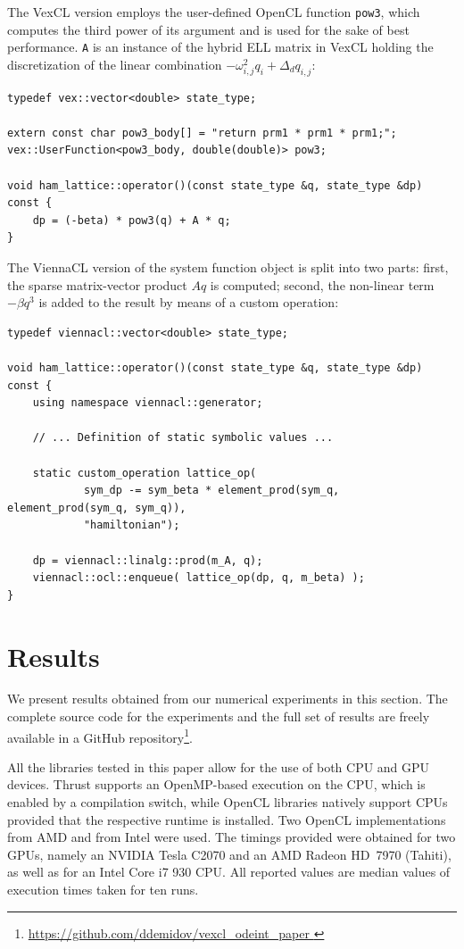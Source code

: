 \documentclass[final]{siamltex}
\newcommand{\code}[1]{\lstinline|#1|}
\begin{document}
The VexCL version employs the user-defined OpenCL function \code{pow3}, which
computes the third power of its argument and is used for the sake of best performance.
\code{A} is an instance of the hybrid ELL matrix in VexCL
holding the discretization of the linear combination $- \omega_{i,j}^2 q_i + \Delta_d q_{i,j}$:
\begin{lstlisting}
typedef vex::vector<double> state_type;

extern const char pow3_body[] = "return prm1 * prm1 * prm1;";
vex::UserFunction<pow3_body, double(double)> pow3;

void ham_lattice::operator()(const state_type &q, state_type &dp) const {
    dp = (-beta) * pow3(q) + A * q;
}
\end{lstlisting}

The ViennaCL version of the system function object is split into two parts: first, the
sparse matrix-vector product $Aq$ is computed; second, the non-linear term
$-\beta q^3$ is added to the result by means of a custom operation:
\begin{lstlisting}
typedef viennacl::vector<double> state_type;

void ham_lattice::operator()(const state_type &q, state_type &dp) const {
    using namespace viennacl::generator;

    // ... Definition of static symbolic values ...

    static custom_operation lattice_op(
            sym_dp -= sym_beta * element_prod(sym_q, element_prod(sym_q, sym_q)),
            "hamiltonian");

    dp = viennacl::linalg::prod(m_A, q);
    viennacl::ocl::enqueue( lattice_op(dp, q, m_beta) );
}
\end{lstlisting}










\section{Results}

We present results obtained from our numerical experiments in this section. The
complete source code for the experiments and the full set of results are freely 
available in a GitHub repository\footnote{ \href{
https://github.com/ddemidov/vexcl_odeint_paper } {
https://github.com/ddemidov/vexcl\_odeint\_paper } }.

All the libraries tested in this paper allow for the use of both CPU and GPU
devices.  Thrust supports an OpenMP-based execution on the CPU, which is
enabled by a compilation switch, while OpenCL libraries natively support CPUs
provided that the respective runtime is installed. Two OpenCL implementations
from AMD and from Intel were used.  The timings provided were obtained
for two GPUs, namely an NVIDIA Tesla C2070 and an AMD Radeon HD~7970 (Tahiti),
as well as for an Intel Core i7 930 CPU. All reported values are median values
of execution times taken for ten runs.
\end{document}
